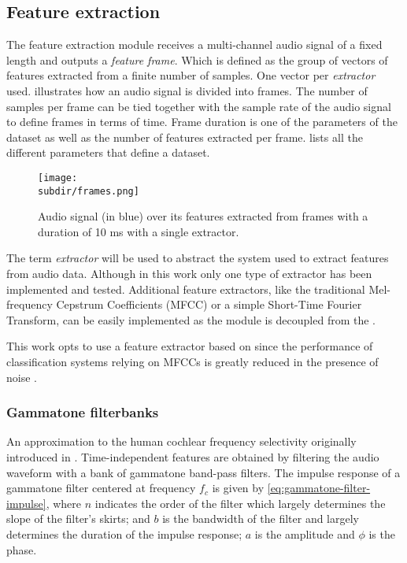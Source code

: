 \subsection{Feature extraction} \label{subsec:feature-extraction}

The feature extraction module receives a multi-channel audio signal of a fixed
length and outputs a \emph{feature frame}. Which is defined as the group of
vectors of features extracted from a finite number of samples. One vector per
\emph{extractor} used.  illustrates how an audio
signal is divided into frames. The number of samples per frame can be tied
together with the sample rate of the audio signal to define frames in terms of
time. Frame duration is one of the parameters of the dataset as well as the
number of features extracted per frame.  lists
all the different parameters that define a dataset.

\begin{figure}
    \centering
    \texttt{[image: \\subdir/frames.png]}
    \caption[Audio frames]{Audio signal (in {\color{blue} blue}) over its
        features extracted from frames with a duration of 10 ms with a single
         extractor.}
    \label{fig:datasets-frames}
\end{figure}

The term \emph{extractor} will be used to abstract the system used to extract
features from audio data. Although in this work only one type of extractor has
been implemented and tested. Additional feature extractors, like the
traditional Mel-frequency Cepstrum Coefficients (MFCC) or a simple Short-Time
Fourier Transform, can be easily implemented as the
 module is decoupled from the
. 

This work opts to use a feature extractor based on
 since the performance of
classification systems relying on MFCCs is greatly reduced in the presence of
noise \cite{marchegiani2018a}.

\subsubsection*{Gammatone filterbanks} \label{subsubsec:gammatone-filterbank}

An approximation to the human cochlear frequency selectivity originally
introduced in \cite{GTF1998}. Time-independent features are obtained by
filtering the audio waveform with a bank of gammatone band-pass filters. The
impulse response of a gammatone filter centered at frequency $f_c$ is given by
\cref{eq:gammatone-filter-impulse}, where $n$ indicates the order of the filter
which largely determines the slope of the filter's skirts; and $b$ is the
bandwidth of the filter and largely determines the duration of the impulse
response; $a$ is the amplitude and $\phi$ is the phase.

